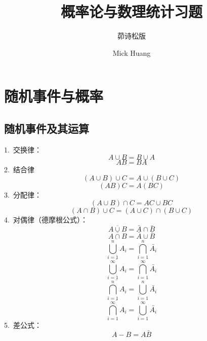 \documentclass[lang=cn,newtx,10pt,scheme=chinese]{elegantbook}
\title{概率论与数理统计习题}
\subtitle{茆诗松版}
\author{Mick Huang}
\begin{document}
\maketitle
\frontmatter

\tableofcontents

\mainmatter

\chapter{随机事件与概率}
\section{随机事件及其运算}

\begin{theorem}[事件运算性质]
    1.\ 交换律：
    \begin{equation}
        A \cup B = B \cup A
    \end{equation}
    \begin{equation}
        AB = BA
    \end{equation}
    2.\ 结合律
    \begin{equation}
        (A \cup B) \cup C = A \cup (B \cup C)
    \end{equation}
    \begin{equation}
        (AB)C = A(BC)
    \end{equation}
    3.\ 分配律：
    \begin{equation}
        (A \cup B) \cap C = AC \cup BC
    \end{equation}
    \begin{equation}
        (A \cap B) \cup C = (A \cup C) \cap (B \cup C)
    \end{equation}
    4.\ 对偶律（德摩根公式）：
    \begin{equation}
        \overline{A \cup B} = \bar{A} \cap \bar{B}
    \end{equation}
    \begin{equation}
        \overline{A \cap B} = \bar{A} \cup \bar{B}
    \end{equation}
    \begin{equation}
        \overline{\bigcup_{i=1}^{n}A_i} = \bigcap_{i=1}^{n}{\bar{A_i}}
    \end{equation}
    \begin{equation}
        \overline{\bigcup_{i=1}^{\infty}A_i} = \bigcap_{i=1}^{\infty}{\bar{A_i}}
    \end{equation}
    \begin{equation}
        \overline{\bigcap_{i=1}^{n}A_i} = \bigcup_{i=1}^{n}{\bar{A_i}}
    \end{equation}
    \begin{equation}
        \overline{\bigcap_{i=1}^{\infty}A_i} = \bigcup_{i=1}^{\infty}{\bar{A_i}}
    \end{equation}
    5.\ 差公式：
    \begin{equation}
        A-B=A\bar{B}
    \end{equation}
\end{theorem}
\newpage
\end{document}
